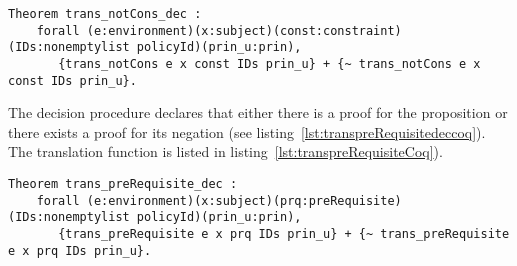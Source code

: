 \begin{minipage}[c]{0.95\textwidth}
\begin{lstlisting}
Theorem trans_notCons_dec :
    forall (e:environment)(x:subject)(const:constraint)(IDs:nonemptylist policyId)(prin_u:prin),
       {trans_notCons e x const IDs prin_u} + {~ trans_notCons e x const IDs prin_u}.

\end{lstlisting}
\end{minipage}

The decision procedure  declares that either there is a proof for the proposition  or there exists a proof for its negation (see listing~\ref{lst:transpreRequisitedeccoq}). The translation function  is listed in listing~\ref{lst:transpreRequisiteCoq}). 


\begin{lstlisting}
Theorem trans_preRequisite_dec :
    forall (e:environment)(x:subject)(prq:preRequisite)(IDs:nonemptylist policyId)(prin_u:prin),
       {trans_preRequisite e x prq IDs prin_u} + {~ trans_preRequisite e x prq IDs prin_u}.
\end{lstlisting}


